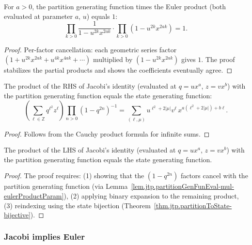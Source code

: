 \begin{lemma}
\label{lem.jtp.partitionGenFunEval-mul-eulerProductParam}
\leanhelper
\leanok
For $a > 0$, the partition generating function times the Euler product
(both evaluated at parameter $a$, $u$) equals $1$:
\[
\prod_{k>0}\frac{1}{1-u^{2k}x^{2ak}} \cdot \prod_{k>0}(1-u^{2k}x^{2ak}) = 1.
\]
\end{lemma}

\begin{proof}
Per-factor cancellation: each geometric series factor
$(1 + u^{2k}x^{2ak} + u^{4k}x^{4ak} + \cdots)$ multiplied by $(1 - u^{2k}x^{2ak})$ gives $1$.
The proof stabilizes the partial products and shows the coefficients eventually agree.
\end{proof}

\begin{lemma}
\label{lem.jtp.jacobiRHS-mul-partGenFun}
\leanhelper
\leanok
The product of the RHS of Jacobi's identity (evaluated at $q=ux^a$, $z=vx^b$) with
the partition generating function equals the state generating function:
\[
\left(\sum_{\ell\in\mathbb{Z}}q^{\ell^{2}}z^{\ell}\right)
\prod_{n>0}(1-q^{2n})^{-1}
=\sum_{(\ell,\mu)}u^{\ell^{2}+2|\mu|}v^{\ell}\,x^{a(\ell^{2}+2|\mu|)+b\ell}.
\]
\end{lemma}

\begin{proof}
Follows from the Cauchy product formula for infinite sums.
\end{proof}

\begin{lemma}
\label{lem.jtp.jacobiLHS-mul-partGenFun}
\leanhelper
\leanok
The product of the LHS of Jacobi's identity (evaluated at $q=ux^a$, $z=vx^b$) with
the partition generating function equals the state generating function.
\end{lemma}

\begin{proof}
\leanok
The proof requires:
(1) showing that the $(1-q^{2n})$ factors cancel with the partition
generating function (via Lemma~\ref{lem.jtp.partitionGenFunEval-mul-eulerProductParam}),
(2) applying binary expansion to the remaining product,
(3) reindexing using the state bijection
(Theorem~\ref{thm.jtp.partitionToState-bijective}).
\end{proof}

\subsubsection{Jacobi implies Euler}

